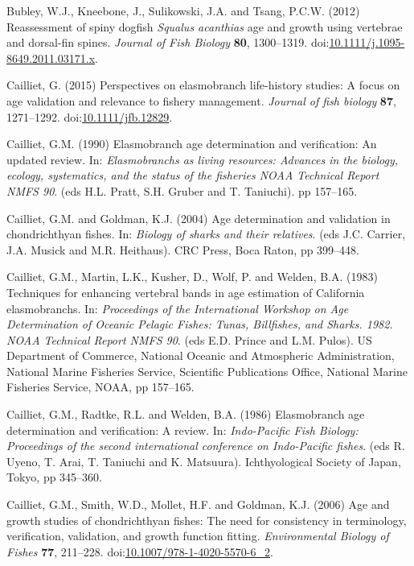 \documentclass[]{article}
\begin{document}
\hypertarget{ref-bubley_reassessment_2012}{}
Bubley, W.J., Kneebone, J., Sulikowski, J.A. and Tsang, P.C.W. (2012)
Reassessment of spiny dogfish \emph{Squalus acanthias} age and growth
using vertebrae and dorsal-fin spines. \emph{Journal of Fish Biology}
\textbf{80}, 1300--1319.
doi:\href{https://doi.org/10.1111/j.1095-8649.2011.03171.x}{10.1111/j.1095-8649.2011.03171.x}.

\hypertarget{ref-cailliet_perspectives_2015}{}
Cailliet, G. (2015) Perspectives on elasmobranch life-history studies: A
focus on age validation and relevance to fishery management.
\emph{Journal of fish biology} \textbf{87}, 1271--1292.
doi:\href{https://doi.org/10.1111/jfb.12829}{10.1111/jfb.12829}.

\hypertarget{ref-cailliet_elasmobranch_1990}{}
Cailliet, G.M. (1990) Elasmobranch age determination and verification:
An updated review. In: \emph{Elasmobranchs as living resources: Advances
in the biology, ecology, systematics, and the status of the fisheries
NOAA Technical Report NMFS 90}. (eds H.L. Pratt, S.H. Gruber and T.
Taniuchi). pp 157--165.

\hypertarget{ref-cailliet_age_2004}{}
Cailliet, G.M. and Goldman, K.J. (2004) Age determination and validation
in chondrichthyan fishes. In: \emph{Biology of sharks and their
relatives}. (eds J.C. Carrier, J.A. Musick and M.R. Heithaus). CRC
Press, Boca Raton, pp 399--448.

\hypertarget{ref-cailliet_techniques_1983}{}
Cailliet, G.M., Martin, L.K., Kusher, D., Wolf, P. and Welden, B.A.
(1983) Techniques for enhancing vertebral bands in age estimation of
California elasmobranchs. In: \emph{Proceedings of the International
Workshop on Age Determination of Oceanic Pelagic Fishes: Tunas,
Billfishes, and Sharks. 1982. NOAA Technical Report NMFS 90}. (eds E.D.
Prince and L.M. Pulos). US Department of Commerce, National Oceanic and
Atmospheric Administration, National Marine Fisheries Service,
Scientific Publications Office, National Marine Fisheries Service, NOAA,
pp 157--165.

\hypertarget{ref-cailliet_elasmobranch_1986}{}
Cailliet, G.M., Radtke, R.L. and Welden, B.A. (1986) Elasmobranch age
determination and verification: A review. In: \emph{Indo-Pacific Fish
Biology: Proceedings of the second international conference on
Indo-Pacific fishes}. (eds R. Uyeno, T. Arai, T. Taniuchi and K.
Matsuura). Ichthyological Society of Japan, Tokyo, pp 345--360.

\hypertarget{ref-cailliet_age_2006}{}
Cailliet, G.M., Smith, W.D., Mollet, H.F. and Goldman, K.J. (2006) Age
and growth studies of chondrichthyan fishes: The need for consistency in
terminology, verification, validation, and growth function fitting.
\emph{Environmental Biology of Fishes} \textbf{77}, 211--228.
doi:\href{https://doi.org/10.1007/978-1-4020-5570-6_2}{10.1007/978-1-4020-5570-6\_2}.
\end{document}
